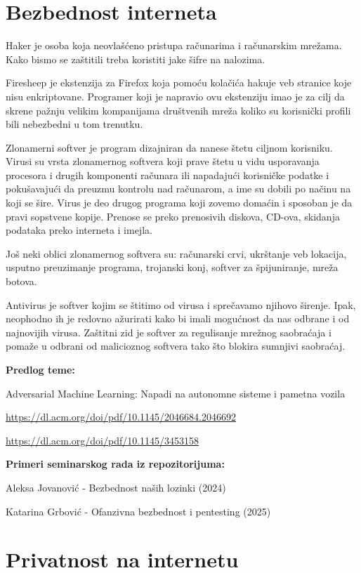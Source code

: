 \documentclass{article}
\begin{document}
\section{Bezbednost interneta}

Haker je osoba koja neovlašćeno pristupa računarima i računarskim mrežama. Kako bismo se zaštitili treba koristiti jake šifre na nalozima.

Firesheep je ekstenzija za Firefox koja pomoću kolačića hakuje veb stranice koje nisu enkriptovane. Programer koji je napravio ovu ekstenziju imao je za cilj da skrene pažnju velikim kompanijama društvenih mreža koliko su korisnički profili bili nebezbedni u tom trenutku.

Zlonamerni softver je program dizajniran da nanese štetu ciljnom korisniku. Virusi su vrsta zlonamernog softvera koji prave štetu u vidu usporavanja procesora i drugih komponenti računara ili napadajući korisničke podatke i pokušavajući da preuzmu kontrolu nad računarom, a ime su dobili po načinu na koji se šire. Virus je deo drugog programa koji zovemo domaćin i sposoban je da pravi sopstvene kopije. Prenose se preko prenosivih diskova, CD-ova, skidanja podataka preko interneta i imejla.

Još neki oblici zlonamernog softvera su: računarski crvi, ukrštanje veb lokacija, usputno preuzimanje programa, trojanski konj, softver za špijuniranje, mreža botova.

Antivirus je softver kojim se štitimo od virusa i sprečavamo njihovo širenje. Ipak, neophodno ih je redovno ažurirati kako bi imali mogućnost da nas odbrane i od najnovijih virusa. Zaštitni zid je softver za regulisanje mrežnog saobraćaja i pomaže u odbrani od malicioznog softvera tako što blokira sumnjivi saobraćaj.

\textbf{Predlog teme:} 

Adversarial Machine Learning: Napadi na autonomne sisteme i pametna vozila

\url{https://dl.acm.org/doi/pdf/10.1145/2046684.2046692}

\url{https://dl.acm.org/doi/pdf/10.1145/3453158}

\textbf{Primeri seminarskog rada iz repozitorijuma:}

Aleksa Jovanović - Bezbednost naših lozinki (2024)

Katarina Grbović - Ofanzivna bezbednost i pentesting (2025)

\section{Privatnost na internetu}
\end{document}
